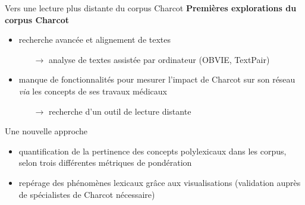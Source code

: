 \begin{frame}{Vers une lecture plus distante du corpus Charcot}
\textbf{Premières explorations du corpus Charcot}
    \begin{itemize}
        \item recherche avancée et alignement de textes 
        \begin{itemize}
        \item[$\rightarrow$] analyse de textes assistée par ordinateur (OBVIE, TextPair)
        \end{itemize}
        \item manque de fonctionnalités pour mesurer l’impact de Charcot sur son réseau \textit{via} les concepts de ses travaux médicaux 
        \begin{itemize}
        \item[$\rightarrow$] recherche d'un outil de \og{}lecture distante\fg{}
        \end{itemize}
    \end{itemize}
    \begin{block}{Une nouvelle approche}
        \begin{itemize}
    \item quantification de la pertinence des concepts polylexicaux dans les corpus, selon trois différentes métriques de pondération
    \item repérage des phénomènes lexicaux grâce aux visualisations (validation auprès de
spécialistes de Charcot nécessaire)
\end{itemize}
    \end{block}
\end{frame}

